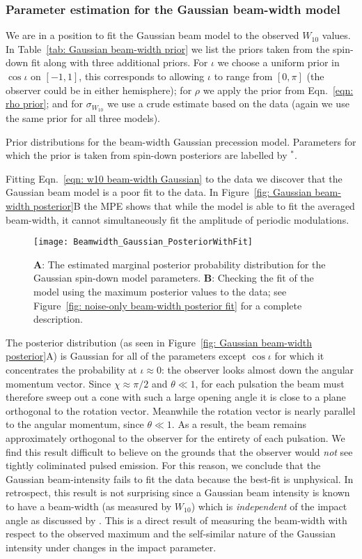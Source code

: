 \documentclass[../full_thesis/full_thesis.tex]{subfiles}
\newcommand{\thisdir}{../comparing_periodic_modulations}
\newcommand{\bigfigurecaptions}[2]{
$\textbf{A}$: The estimated marginal posterior probability distribution for the
#1 #2 model parameters. $\textbf{B}$: Checking the fit of the model using the
maximum posterior values to the data; see Figure~\ref{fig: noise-only beam-width
posterior fit} for a complete description.}
\begin{document}
\subsubsection{Parameter estimation for the Gaussian beam-width model}

We are in a position to fit the Gaussian beam model to the observed $W_{10}$
values. In Table~\ref{tab: Gaussian beam-width prior} we list the priors taken
from the spin-down fit along with three additional priors. For $\iota$ we
choose a uniform prior in $\cos\iota$ on $[-1, 1]$, this corresponds to
allowing $\iota$ to range from $[0, \pi]$ (the observer could be in either
hemisphere); for $\rho$ we apply the prior from Eqn.~\eqref{eqn: rho
prior}; and for $\sigma_{W_{10}}$ we use a crude estimate based on the
data (again we use the same prior for all three models).
\begin{table}
\centering
\caption{Prior distributions for the beam-width Gaussian precession model. Parameters
for which the prior is taken from spin-down posteriors are labelled by $^{*}$.}
\label{tab: Gaussian beam-width prior}

\end{table}

Fitting Eqn.~\eqref{eqn: w10 beam-width Gaussian} to the data we discover that
the Gaussian beam model is a poor fit to the data. In Figure~\ref{fig: Gaussian
beam-width posterior}B the MPE shows that while the model is able to fit the
averaged beam-width, it cannot simultaneously fit the amplitude of periodic
modulations.
\begin{figure*}
\centering
\texttt{[image: Beamwidth\_Gaussian\_PosteriorWithFit]}
\caption{\bigfigurecaptions{Gaussian}{spin-down}}
\label{fig: Gaussian beam-width posterior}
\end{figure*}

The posterior distribution (as seen in Figure~\ref{fig: Gaussian beam-width
posterior}A) is Gaussian for all of the parameters except $\cos\iota$ for which
it concentrates the probability at $\iota\approx0$: the observer looks almost
down the angular momentum vector. Since $\chi\approx\pi/2$ and $\theta \ll 1$,
for each pulsation the beam must therefore sweep out a cone with such a large opening angle
it is close to a plane orthogonal to the rotation vector. Meanwhile the
rotation vector is nearly parallel to the angular momentum, since $\theta \ll
1$. As a result, the beam remains approximately orthogonal to the observer for
the entirety of each pulsation.  We find this result difficult to believe on
the grounds that the observer would \emph{not} see tightly coliminated pulsed
emission.  For this reason, we conclude that the Gaussian beam-intensity fails
to fit the data because the best-fit is unphysical.
In retrospect, this result is not surprising since a Gaussian beam intensity is
known to have a beam-width (as measured by $W_{10}$) which is \emph{independent} of
the impact angle as discussed by \citet{Akgun2006}. This is a direct result of
measuring the beam-width with respect to the observed maximum and the self-similar
nature of the Gaussian intensity under changes in the impact parameter.
\end{document}
